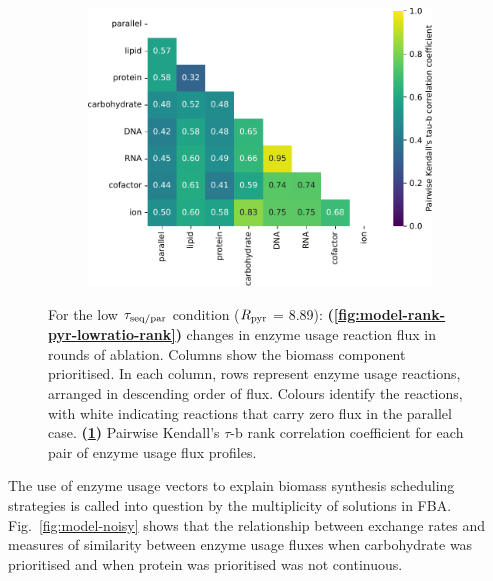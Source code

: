 \begin{figure}[htbp!]
\begin{subfigure}[t]{0.45\textwidth}
    \includegraphics[width=\linewidth]{CompareEnzUse_glc00p00_pyr08p89_ammUnres_2.pdf}
    \caption{
    }
    \label{fig:model-rank-pyr-lowratio-kendall}
  \end{subfigure}

  \caption[
    Changes in enzyme usage reaction flux and Kendall's $\tau$-b rank correlation coefficient for each pair, $\exchrate{pyr}$ = \SI{8.89}{\mmolgdwh}.
  ]{
    For the low $\tau_{\mathrm{seq}/\mathrm{par}}$ condition ($\exchrate{pyr}$ = \SI{8.89}{\mmolgdwh}):
    \textbf{(\ref{fig:model-rank-pyr-lowratio-rank})}
    changes in enzyme usage reaction flux in rounds of ablation.
    Columns show the biomass component prioritised.
    In each column, rows represent enzyme usage reactions, arranged in descending order of flux.
    Colours identify the reactions, with white indicating reactions that carry zero flux in the parallel case.
    \textbf{(\ref{fig:model-rank-pyr-lowratio-kendall})}
    Pairwise Kendall's $\tau$-b rank correlation coefficient \parencite{kendallTREATMENTTIESRANKING1945} for each pair of enzyme usage flux profiles.
  }
  \label{fig:model-rank-pyr-lowratio}
\end{figure}

The use of enzyme usage vectors to explain biomass synthesis scheduling strategies is called into question by the multiplicity of solutions in FBA\@.
Fig.\ \ref{fig:model-noisy} shows that the relationship between exchange rates and measures of similarity between enzyme usage fluxes when carbohydrate was prioritised and when protein was prioritised was not continuous.

